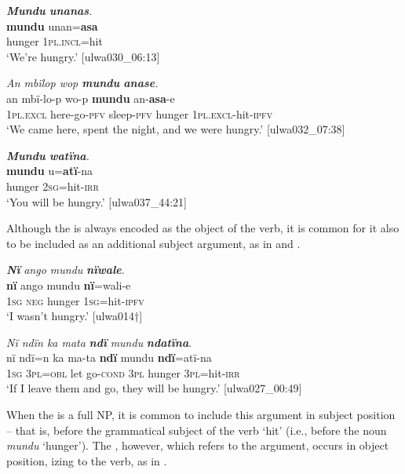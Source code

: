 \ea%
    \label{ex:clause:86}
          \textit{\textbf{Mundu} \textbf{unanas}.}\\
\gll    \textbf{mundu}  unan=\textbf{asa}\\
    hunger  1\textsc{pl.incl}=hit\\
\glt `We’re hungry.’ [ulwa030\_06:13]
\z

\ea%
    \label{ex:clause:87}
          \textit{An mbïlop wop \textbf{mundu} \textbf{anase}.}\\
\gll    an      mbï-lo-p    wo-p    \textbf{mundu}  an-\textbf{asa}-e\\
    \textsc{1pl.excl}  here-go-\textsc{pfv}  sleep-\textsc{pfv}  hunger  1\textsc{pl.excl}{}-hit-\textsc{ipfv}\\
\glt `We came here, spent the night, and we were hungry.’ [ulwa032\_07:38]
\z

\ea%
    \label{ex:clause:88}
          \textit{\textbf{Mundu} \textbf{watïna}.}\\
\gll    \textbf{mundu}  u=\textbf{atï}-na\\
    hunger  \textsc{2sg}=hit-\textsc{irr}\\
\glt `You will be hungry.’ [ulwa037\_44:21]
\z

  Although the  is always encoded as the object of the verb, it is common for it also to be included as an additional subject argument, as in  and .

\ea%
    \label{ex:clause:89}
          \textbf{\textit{Nï}} \textit{ango mundu} \textbf{\textit{nïwale}}.\\
\gll \textbf{nï}    ango  mundu  \textbf{nï}=wali-e\\
    1\textsc{sg}  \textsc{neg}  hunger  1\textsc{sg}=hit-\textsc{ipfv}\\
\glt `I wasn’t hungry.’ [ulwa014†]
\z

\ea%
    \label{ex:clause:90}
          \textit{Nï ndïn ka mata} \textbf{\textit{ndï}} \textit{mundu} \textbf{\textit{ndatïna}}.\\
\gll nï    ndï=n    ka  ma-ta    \textbf{ndï}  mundu  \textbf{ndï}=atï-na\\
    1\textsc{sg}  \textsc{3pl=obl}  let  go-\textsc{cond}  3\textsc{pl}  hunger  \textsc{3pl}=hit-\textsc{irr}\\
\glt `If I leave them and go, they will be hungry.’ [ulwa027\_00:49]
\z

When the  is a full NP, it is common to include this argument in subject position -- that is, before the grammatical subject of the verb ‘hit’ (i.e., before the noun \textit{mundu} ‘hunger’). The , however, which refers to the  argument, occurs in object position, izing to the verb, as in .

